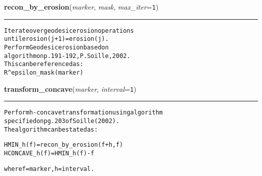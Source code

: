     \label{multireg:morph:recon_by_erosion}
    \vspace{0.5ex}

    \begin{boxedminipage}{\textwidth}

    \raggedright \textbf{recon\_by\_erosion}(\textit{marker}, \textit{mask}, \textit{max\_iter}=\texttt{1\-})

    \vspace{-1.5ex}

    \rule{\textwidth}{0.5\fboxrule}
\begin{alltt}
Iterate over geodesic erosion operations
until erosion(j+1) = erosion(j).
Perform Geodesic erosion based on
algorithm on p. 191-192, P. Soille, 2002. 
This can be referenced as:
  R{\textasciicircum}epsilon\_mask(marker)\end{alltt}

    \vspace{1ex}

    \end{boxedminipage}

    \label{multireg:morph:transform_concave}
    \vspace{0.5ex}

    \begin{boxedminipage}{\textwidth}

    \raggedright \textbf{transform\_concave}(\textit{marker}, \textit{interval}=\texttt{1\-})

    \vspace{-1.5ex}

    \rule{\textwidth}{0.5\fboxrule}
\begin{alltt}
Perform h-concave transformation using algorithm
specified on pg. 203 of Soille (2002).
The algorithm can be stated as:

    HMIN\_h(f) = recon\_by\_erosion(f+h,f)  
    HCONCAVE\_h(f) = HMIN\_h(f) - f

where f = marker, h = interval.\end{alltt}

    \vspace{1ex}

    \end{boxedminipage}

    \label{multireg:morph:transform_convex}
    \vspace{0.5ex}

